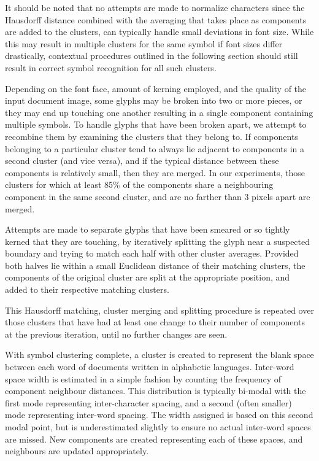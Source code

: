\documentclass[times, 10pt,twocolumn]{article}
\begin{document}
It should be noted that no attempts are made to normalize characters since the
Hausdorff distance combined with the averaging that takes place as components
are added to the clusters, can typically handle small deviations in font size.
While this may result in multiple clusters for the same symbol if font sizes
differ drastically, contextual procedures outlined in the following section
should still result in correct symbol recognition for all such clusters.

Depending on the font face, amount of kerning employed, and the quality of the
input document image, some glyphs may be broken into two or more pieces, or
they may end up touching one another resulting in a single component containing
multiple symbols.
To handle glyphs that have been broken apart, we attempt to recombine them by
examining the clusters that they belong to.  If components belonging to a
particular cluster tend to always lie adjacent to components in a second
cluster (and vice versa), and if the typical distance between these components
is relatively small, then they are merged.  In our experiments, those clusters
for which at least 85\% of the components share a neighbouring component in the
same second cluster, and are no farther than 3 pixels apart are merged.

Attempts are made to separate glyphs that have been smeared or so tightly
kerned that they are touching, by iteratively splitting the glyph near a
suspected boundary and trying to match each half with other cluster averages.
Provided both halves lie within a small Euclidean distance of their matching
clusters, the components of the original cluster are split at the appropriate
position, and added to their respective matching clusters.

This Hausdorff matching, cluster merging and splitting procedure is repeated
over those clusters that have had at least one change to their number of 
components at the previous iteration, until no further changes are seen.

With symbol clustering complete, a cluster is created to represent the blank
space between each word of documents written in alphabetic languages.
Inter-word space width is estimated in a simple fashion by counting the
frequency of component neighbour distances.  This distribution is typically
bi-modal with the first mode representing inter-character spacing, and a second
(often smaller) mode representing inter-word spacing.  The width assigned
is based on this second modal point, but is underestimated slightly to ensure no
actual inter-word spaces are missed.  New components are created representing
each of these spaces, and neighbours are updated appropriately.
\end{document}

